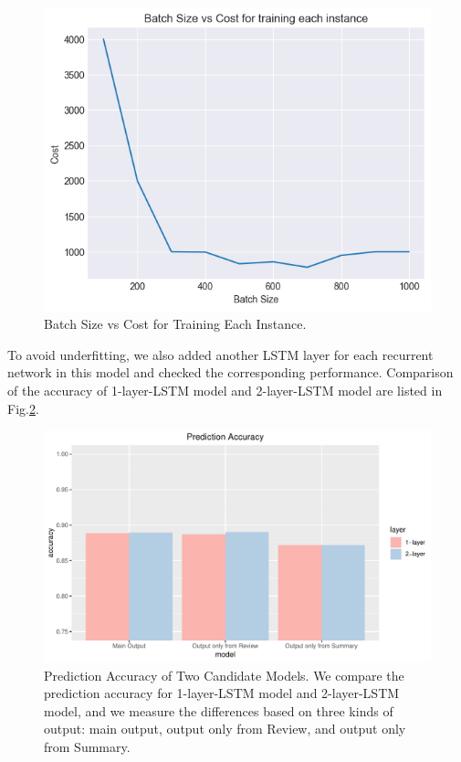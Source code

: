 \documentclass[letterpaper]{article} %
\begin{document}
\begin{figure}[!h]
\centering
\includegraphics[width=0.9\columnwidth]{pics/pr_batch.png}
\caption{Batch Size vs Cost for Training Each Instance.}
\label{batch_size}
\end{figure}

 To avoid underfitting, we also added another LSTM layer for each recurrent network in this model and checked the corresponding performance. Comparison of the accuracy of 1-layer-LSTM model and 2-layer-LSTM model are listed in Fig.\ref{predAcc}.

\begin{figure}[!h]
\centering
\includegraphics[width=1.0\columnwidth]{plot_acc.pdf}
\caption{Prediction Accuracy of Two Candidate Models. We compare the prediction accuracy for 1-layer-LSTM model and 2-layer-LSTM model, and we measure the differences based on three kinds of output: main output, output only from Review, and output only from Summary. }
\label{predAcc}
\end{figure}
\end{document}
